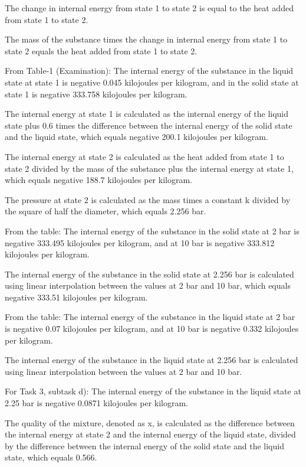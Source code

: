 The change in internal energy from state 1 to state 2 is equal to the heat added from state 1 to state 2.

The mass of the substance times the change in internal energy from state 1 to state 2 equals the heat added from state 1 to state 2.

From Table-1 (Examination):
The internal energy of the substance in the liquid state at state 1 is negative 0.045 kilojoules per kilogram, and in the solid state at state 1 is negative 333.758 kilojoules per kilogram.

The internal energy at state 1 is calculated as the internal energy of the liquid state plus 0.6 times the difference between the internal energy of the solid state and the liquid state, which equals negative 200.1 kilojoules per kilogram.

The internal energy at state 2 is calculated as the heat added from state 1 to state 2 divided by the mass of the substance plus the internal energy at state 1, which equals negative 188.7 kilojoules per kilogram.

The pressure at state 2 is calculated as the mass times a constant k divided by the square of half the diameter, which equals 2.256 bar.

From the table:
The internal energy of the substance in the solid state at 2 bar is negative 333.495 kilojoules per kilogram, and at 10 bar is negative 333.812 kilojoules per kilogram.

The internal energy of the substance in the solid state at 2.256 bar is calculated using linear interpolation between the values at 2 bar and 10 bar, which equals negative 333.51 kilojoules per kilogram.

From the table:
The internal energy of the substance in the liquid state at 2 bar is negative 0.07 kilojoules per kilogram, and at 10 bar is negative 0.332 kilojoules per kilogram.

The internal energy of the substance in the liquid state at 2.256 bar is calculated using linear interpolation between the values at 2 bar and 10 bar.

For Task 3, subtask d):
The internal energy of the substance in the liquid state at 2.25 bar is negative 0.0871 kilojoules per kilogram.

The quality of the mixture, denoted as x, is calculated as the difference between the internal energy at state 2 and the internal energy of the liquid state, divided by the difference between the internal energy of the solid state and the liquid state, which equals 0.566.